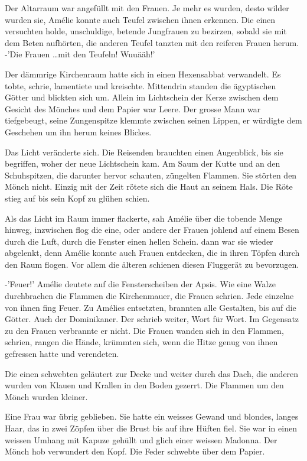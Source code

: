 \documentclass[11pt,titlepage,a5paper]{book}
\begin{document}
Der Altarraum war angefüllt mit den Frauen. Je mehr es wurden, desto wilder wurden sie, Amélie konnte auch Teufel zwischen ihnen erkennen. Die einen versuchten holde, unschuldige, betende Jungfrauen zu bezirzen, sobald sie mit dem Beten aufhörten, die anderen Teufel tanzten mit den reiferen Frauen herum. -'Die Frauen \dots mit den Teufeln! Wuuääh!' 

Der dämmrige Kirchenraum hatte sich in einen Hexensabbat verwandelt. Es tobte, schrie, lamentiete und kreischte. Mittendrin standen die ägyptischen Götter und blickten sich um. Allein im Lichtschein der Kerze zwischen dem Gesicht des Mönches und dem Papier war Leere. Der grosse Mann war tiefgebeugt, seine Zungenspitze klemmte zwischen seinen Lippen, er würdigte dem Geschehen um ihn herum keines Blickes.

Das Licht veränderte sich. Die Reisenden brauchten einen Augenblick, bis sie begriffen, woher der neue Lichtschein kam. Am Saum der Kutte und an den Schuhspitzen, die darunter hervor schauten, züngelten Flammen. Sie störten den Mönch nicht. Einzig mit der Zeit rötete sich die Haut an seinem Hals. Die Röte stieg auf bis sein Kopf zu glühen schien. 

Als das Licht im Raum immer flackerte, sah Amélie über die tobende Menge hinweg, inzwischen flog die eine, oder andere der Frauen johlend auf einem Besen durch die Luft, durch die Fenster einen hellen Schein. dann war sie wieder abgelenkt, denn Amélie konnte auch Frauen entdecken, die in ihren Töpfen durch den Raum flogen. Vor allem die älteren schienen diesen Fluggerät zu bevorzugen. 

-'Feuer!' Amélie deutete auf die Fensterscheiben der Apsis. Wie eine Walze durchbrachen die Flammen die Kirchenmauer, die Frauen schrien. Jede einzelne von ihnen fing Feuer. Zu Amélies entsetzten, brannten alle Gestalten, bis auf die Götter. Auch der Dominikaner. Der schrieb weiter, Wort für Wort. Im Gegensatz zu den Frauen verbrannte er nicht. Die Frauen wanden sich in den Flammen, schrien, rangen die Hände, krümmten sich, wenn die Hitze genug von ihnen gefressen hatte und verendeten.

Die einen schwebten geläutert zur Decke und weiter durch das Dach, die anderen wurden von Klauen und Krallen in den Boden gezerrt. Die Flammen um den Mönch wurden kleiner.

Eine Frau war übrig geblieben. Sie hatte ein weisses Gewand und blondes, langes Haar, das in zwei Zöpfen über die Brust bis auf ihre Hüften fiel. Sie war in einen weissen Umhang mit Kapuze gehüllt und glich einer weissen Madonna. Der Mönch hob verwundert den Kopf. Die Feder schwebte über dem Papier. 
\end{document}
